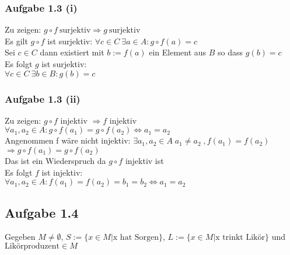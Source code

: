 \documentclass{article}
\begin{document}
            \subsubsection*{Aufgabe 1.3 (i)}
                Zu zeigen: \(g \circ f \: \text{surjektiv} \Rightarrow g \: \text{surjektiv}\) \\
                Es gilt \(g \circ f\) ist surjektiv: \(\forall c \in C \: \exists a \in A : g \circ f(a) = c\) \\
                Sei \(c \in C \) dann existiert mit \(b := f(a)\) ein Element aus \(B\) so dass \(g(b) = c\) \\
                Es folgt \(g\) ist surjektiv: \\
                \(\forall c \in C \: \exists b \in B: g(b) = c\)

            \subsubsection*{Aufgabe 1.3 (ii)}
                Zu zeigen: \(g \circ f\) injektiv \(\Rightarrow f\) injektiv \\
                \(\forall a_1, a_2 \in A: g \circ f(a_1) = g \circ f(a_2) \Leftrightarrow a_1 = a_2\) \\

                Angenommen f wäre nicht injektiv: \(\exists a_1,a_2 \in A \; a_1 \neq a_2 \; , f(a_1) = f(a_2) \) \\
                \(\Rightarrow g \circ f(a_1) = g \circ f(a_2) \) \\
                Das ist ein Wiederspruch da \(g \circ f\) injektiv ist \\
                Es folgt \(f\) ist injektiv: \\
                \(\forall a_1, a_2 \in A: f(a_1) = f(a_2) = b_1 = b_2 \Leftrightarrow a_1 = a_2 \) \\

        \subsection*{Aufgabe 1.4}
            Gegeben \(M \not= \emptyset \), \(S:=\{x \in M | \text{x hat Sorgen}\} \), \(L:=\{x \in M | \text{x trinkt Likör}\} \) und \(\text{Likörproduzent} \in M\)
\end{document}
